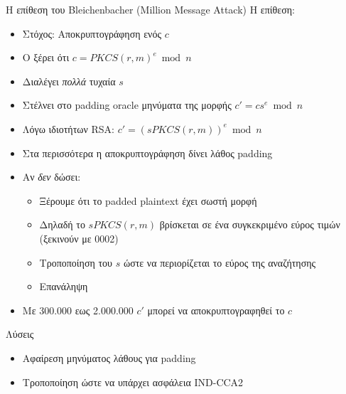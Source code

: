 \documentclass[handout]{beamer}
\begin{document}
\begin{frame}[allowframebreaks]{Η επίθεση του Bleichenbacher (Million Message Attack)}
\framebreak 
Η επίθεση:
\begin{itemize}
\item Στόχος: Αποκρυπτογράφηση ενός $c$ 
\item Ο \adv ξέρει ότι $c= PKCS(r,m)^e \bmod{n}$
\item Διαλέγει \emph{πολλά} τυχαία $s$
\item Στέλνει στο padding oracle μηνύματα της μορφής $ c'= c s^e \bmod{n}$ 
\item Λόγω ιδιοτήτων RSA: $c' = (s PKCS(r,m))^e \bmod{n}$
\item Στα περισσότερα η αποκρυπτογράφηση δίνει λάθος padding
\framebreak
\item Αν \emph{δεν} δώσει:
\begin{itemize} 
\item Ξέρουμε ότι το padded plaintext έχει σωστή μορφή
\item Δηλαδή το $sPKCS(r,m)$ βρίσκεται σε ένα συγκεκριμένο εύρος τιμών (ξεκινούν με 0002)
\item Τροποποίηση του $s$ ώστε να περιορίζεται το εύρος της αναζήτησης
\item Επανάληψη
\end{itemize} 
\item Με 300.000 εως 2.000.000 $c'$ μπορεί να αποκρυπτογραφηθεί το $c$ 
\end{itemize}

\begin{block}{Λύσεις}
\begin{itemize}
    \item Αφαίρεση μηνύματος λάθους για padding
    \item Τροποποίηση ώστε να υπάρχει ασφάλεια IND-CCA2 
\end{itemize}


\end{block}


\end{frame}
\end{document}

